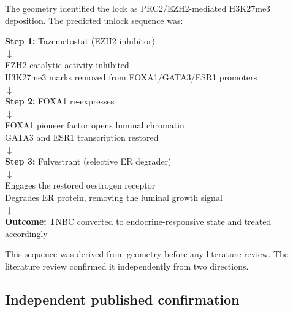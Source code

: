 \documentclass[12pt, a4paper]{article}
\begin{document}
The geometry identified the lock as PRC2/EZH2-mediated
H3K27me3 deposition. The predicted unlock sequence was:

\begin{center}
\colorbox{mechanismbox}{
\begin{minipage}{0.82\textwidth}
\vspace{0.5em}
\centering
\textbf{Step 1:} Tazemetostat (EZH2 inhibitor)\\
$\downarrow$\\
EZH2 catalytic activity inhibited\\
H3K27me3 marks removed from FOXA1/GATA3/ESR1 promoters\\
$\downarrow$\\
\textbf{Step 2:} FOXA1 re-expresses\\
$\downarrow$\\
FOXA1 pioneer factor opens luminal chromatin\\
GATA3 and ESR1 transcription restored\\
$\downarrow$\\
\textbf{Step 3:} Fulvestrant (selective ER degrader)\\
$\downarrow$\\
Engages the restored oestrogen receptor\\
Degrades ER protein, removing the luminal growth signal\\
$\downarrow$\\
\textbf{Outcome:} TNBC converted to endocrine-responsive
state and treated accordingly
\vspace{0.5em}
\end{minipage}
}
\end{center}

This sequence was derived from geometry before any
literature review. The literature review confirmed it
independently from two directions.

\subsection{Independent published confirmation}
\end{document}
